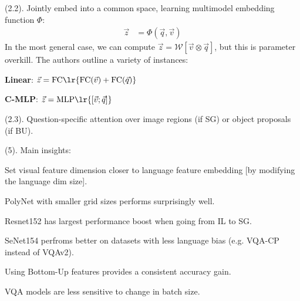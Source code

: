 \documentclass[11pt]{article}
\begin{document}
 (2.2). Jointly embed into a common space, learning multimodel embedding function $\Phi$:
\begin{align}
	\vec z &= \Phi (\vec q, \vec v)
\end{align}
In the most general case, we can compute $\vec z = \mathcal W [\vec v \otimes \vec q]$, but this is parameter overkill. The authors outline a variety of instances:
\begin{compactitem}
	\item \textbf{Linear}: $\vec z = \text{FC}\lr{  \text{FC}(\vec v) + \text{FC}(\vec q) }$
	\item \textbf{C-MLP}: $\vec z = \text{MLP}\lr{ [\vec v; \vec q] }$
\end{compactitem}

 (2.3). Question-specific attention over image regions (if SG) or object proposals (if BU).


 (5). Main insights:
\begin{compactitem}
	\item Set visual feature dimension closer to language feature embedding [by modifying the language dim size]. 
	\item PolyNet with smaller grid sizes performs surprisingly well. 
	\item Resnet152 has largest performance boost when going from IL to SG. 
	\item SeNet154 perfroms better on datasets with less language bias (e.g. VQA-CP instead of VQAv2). 
	\item Using Bottom-Up features provides a consistent accuracy gain. 
	\item VQA models are less sensitive to change in batch size.
\end{compactitem}









\end{document}
